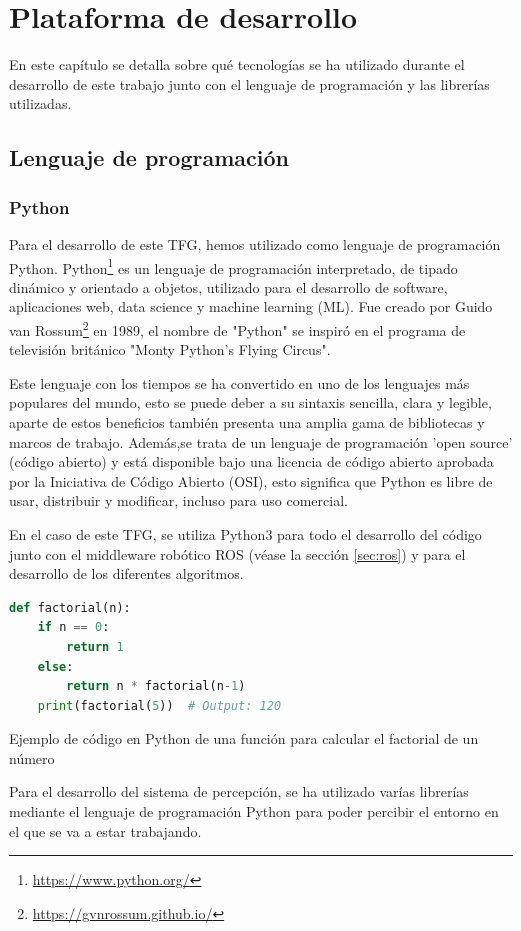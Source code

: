 \chapter{Plataforma de desarrollo}
\label{cap:capitulo3}

En este capítulo se detalla sobre qué tecnologías se ha utilizado durante el desarrollo de este trabajo junto con el lenguaje de programación y las librerías utilizadas.
\section{Lenguaje de programación}
\label{sec:programación}
\subsection{Python}
\label{sec:python}
Para el desarrollo de este TFG, hemos utilizado como lenguaje de programación Python. Python\footnote{\url{https://www.python.org/}} es un lenguaje de programación interpretado, 
de tipado dinámico y orientado a objetos,
utilizado para el desarrollo de software, aplicaciones web, data science y machine learning (ML).  
Fue creado por Guido van Rossum\footnote{\url{https://gvnrossum.github.io/}} en 1989, el nombre de "Python" se inspiró en el programa de televisión británico 
"Monty Python's Flying Circus".

Este lenguaje con los tiempos se ha convertido en uno de los lenguajes más populares del mundo, esto se puede deber a su sintaxis sencilla, clara y legible, aparte 
de estos beneficios también presenta una amplia gama de bibliotecas y marcos de trabajo. Además,se trata de un lenguaje de programación 'open source' (código abierto) y está disponible bajo
una licencia de código abierto aprobada por la Iniciativa de Código Abierto (OSI), esto significa que Python es libre de usar, distribuir y modificar, incluso para uso
comercial.

En el caso de este TFG, se utiliza Python3 para todo el desarrollo del código junto con el middleware robótico ROS (véase la sección \ref{sec:ros}) y para el desarrollo
de los diferentes algoritmos. 

\begin{code}[h]
\begin{lstlisting}[language=Python]
  def factorial(n):
    if n == 0:
        return 1
    else:
        return n * factorial(n-1)
    print(factorial(5))  # Output: 120

\end{lstlisting}
\caption[Ejemplo de código en Python de una función para calcular el factorial de un número]{Ejemplo de código en Python de una función para calcular el factorial de un número}
\label{cod:codejemplo}
\end{code}  
Para el desarrollo del sistema de percepción, se ha  utilizado varías librerías mediante el lenguaje de programación Python para poder
percibir el entorno en el que se va a estar trabajando. 
